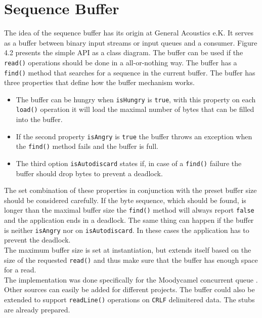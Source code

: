 \section{Sequence Buffer}
The idea of the sequence buffer has its origin at General Acoustics e.K. It serves as a buffer between binary input streams or input queues and a consumer. Figure 4.2 presents the simple API as a class diagram. The buffer can be used if the \texttt{read()} operations should be done in a all-or-nothing way. The buffer has a \texttt{find()} method that searches for a sequence in the current buffer. The buffer has three properties that define how the buffer mechanism works.
\pagebreak
\begin{itemize}
	\item The buffer can be hungry when \texttt{isHungry} is \texttt{true}, with this property on each \texttt{load()} operation it will load the maximal number of bytes that can be filled into the buffer. 
	\item If the second property \texttt{isAngry} is \texttt{true} the buffer throws an exception when the \texttt{find()} method fails and the buffer is full. 
	\item The third option \texttt{isAutodiscard} states if, in case of a \texttt{find()} failure the buffer should drop bytes to prevent a deadlock.
\end{itemize}
The set combination of these properties in conjunction with the preset buffer size should be considered carefully. If the byte sequence, which should be found, is longer than the maximal buffer size the \texttt{find()} method will always report \texttt{false} and the application ends in a deadlock. The same thing can happen if the buffer is neither \texttt{isAngry} nor on \texttt{isAutodiscard}. In these cases the application has to prevent the deadlock.\\
The maximum buffer size is set at instantiation, but extends itself based on the size of the requested \texttt{read()} and thus make sure that the buffer has enough space for a read.\\
The implementation was done specifically for the Moodycamel concurrent queue \cite{moody}. Other sources can easily be added for different projects. The buffer could also be extended to support \texttt{readLine()} operations on \texttt{CRLF} delimitered data. The stubs are already prepared. 
